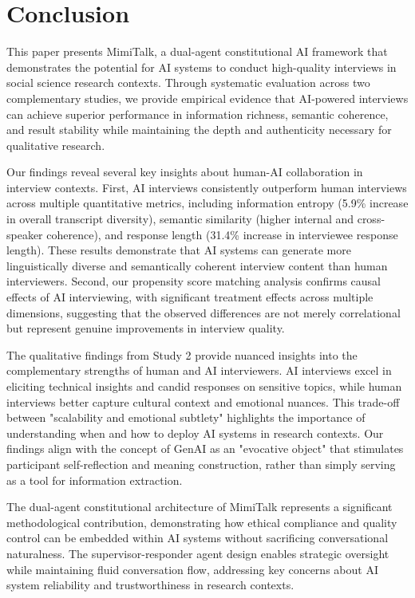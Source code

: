 \documentclass[sigchi,nonacm,manuscript]{acmart}
\begin{document}
\section{Conclusion}
This paper presents MimiTalk, a dual-agent constitutional AI framework that demonstrates the potential for AI systems to conduct high-quality interviews in social science research contexts. Through systematic evaluation across two complementary studies, we provide empirical evidence that AI-powered interviews can achieve superior performance in information richness, semantic coherence, and result stability while maintaining the depth and authenticity necessary for qualitative research.

Our findings reveal several key insights about human-AI collaboration in interview contexts. First, AI interviews consistently outperform human interviews across multiple quantitative metrics, including information entropy (5.9\% increase in overall transcript diversity), semantic similarity (higher internal and cross-speaker coherence), and response length (31.4\% increase in interviewee response length). These results demonstrate that AI systems can generate more linguistically diverse and semantically coherent interview content than human interviewers. Second, our propensity score matching analysis confirms causal effects of AI interviewing, with significant treatment effects across multiple dimensions, suggesting that the observed differences are not merely correlational but represent genuine improvements in interview quality.

The qualitative findings from Study 2 provide nuanced insights into the complementary strengths of human and AI interviewers. AI interviews excel in eliciting technical insights and candid responses on sensitive topics, while human interviews better capture cultural context and emotional nuances. This trade-off between "scalability and emotional subtlety" highlights the importance of understanding when and how to deploy AI systems in research contexts. Our findings align with the concept of GenAI as an "evocative object" that stimulates participant self-reflection and meaning construction, rather than simply serving as a tool for information extraction.

The dual-agent constitutional architecture of MimiTalk represents a significant methodological contribution, demonstrating how ethical compliance and quality control can be embedded within AI systems without sacrificing conversational naturalness. The supervisor-responder agent design enables strategic oversight while maintaining fluid conversation flow, addressing key concerns about AI system reliability and trustworthiness in research contexts.
\end{document}
